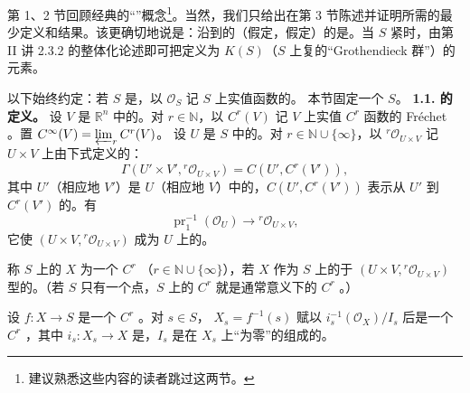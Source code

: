 第 1、2 节回顾经典的“”概念\footnote{建议熟悉这些内容的读者跳过这两节。}。当然，我们只给出在第 3 节陈述并证明所需的最少定义和结果。该更确切地说是：沿到的（假定，假定）的是。当 $S$ 紧时，由第 II 讲 2.3.2 的整体化论述即可把定义为 $K(S)$（$S$ 上复的“Grothendieck 群”）的元素。

以下始终约定：若 $S$ 是，以 $\mathcal O_S$ 记 $S$ 上实值函数的。
本节固定一个 $S$。
\textbf{1.1. 的定义。}
设 $V$ 是 $\mathbb R^n$ 中的。对 $r\in\mathbb N$，以 $C^r(V)$ 记 $V$ 上实值 $C^r$ 函数的 Fréchet 。置 $C^\infty(V)=\varprojlim_r C^r(V)$。
设 $U$ 是 $S$ 中的。对 $r\in\mathbb N\cup\{\infty\}$，以 ${}^r\mathcal O_{U\times V}$ 记 $U\times V$ 上由下式定义的：
\[\Gamma(U'\times V',{}^r\mathcal O_{U\times V})=C(U',C^r(V')),\]
其中 $U'$（相应地 $V'$）是 $U$（相应地 $V$）中的，$C(U',C^r(V'))$ 表示从 $U'$ 到 $C^r(V')$ 的。有
\[\operatorname{pr}_1^{-1}(\mathcal O_U)\longrightarrow{}^r\mathcal O_{U\times V},\]
它使 $(U\times V,{}^r\mathcal O_{U\times V})$ 成为 $U$ 上的。

称 $S$ 上的 $X$ 为一个 $C^r$ （$r\in\mathbb N\cup\{\infty\}$），若 $X$ 作为 $S$ 上的于 $(U\times V,{}^r\mathcal O_{U\times V})$ 型的。（若 $S$ 只有一个点，$S$ 上的 $C^r$ 就是通常意义下的 $C^r$ 。）

设 $f:X\to S$ 是一个 $C^r$ 。对 $s\in S$， $X_s=f^{-1}(s)$ 赋以 $i_s^{-1}(\mathcal O_X)/I_s$ 后是一个 $C^r$ ，其中 $i_s:X_s\to X$ 是，$I_s$ 是在 $X_s$ 上“为零”的组成的。

